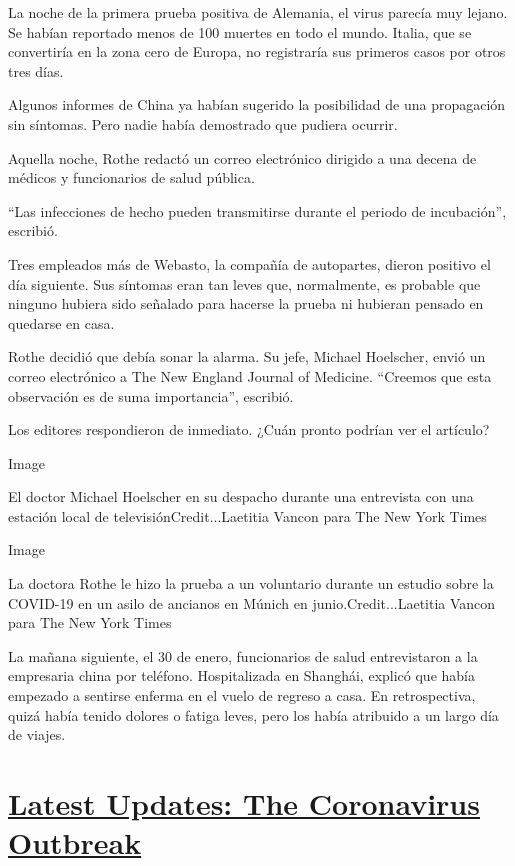 La noche de la primera prueba positiva de Alemania, el virus parecía muy
lejano. Se habían reportado menos de 100 muertes en todo el mundo.
Italia, que se convertiría en la zona cero de Europa, no registraría sus
primeros casos por otros tres días.

Algunos informes de China ya habían sugerido la posibilidad de una
propagación sin síntomas. Pero nadie había demostrado que pudiera
ocurrir.

Aquella noche, Rothe redactó un correo electrónico dirigido a una decena
de médicos y funcionarios de salud pública.

``Las infecciones de hecho pueden transmitirse durante el periodo de
incubación'', escribió.

Tres empleados más de Webasto, la compañía de autopartes, dieron
positivo el día siguiente. Sus síntomas eran tan leves que, normalmente,
es probable que ninguno hubiera sido señalado para hacerse la prueba ni
hubieran pensado en quedarse en casa.

Rothe decidió que debía sonar la alarma. Su jefe, Michael Hoelscher,
envió un correo electrónico a The New England Journal of Medicine.
``Creemos que esta observación es de suma importancia'', escribió.

Los editores respondieron de inmediato. ¿Cuán pronto podrían ver el
artículo?

Image

El doctor Michael Hoelscher en su despacho durante una entrevista con
una estación local de televisiónCredit...Laetitia Vancon para The New
York Times

Image

La doctora Rothe le hizo la prueba a un voluntario durante un estudio
sobre la COVID-19 en un asilo de ancianos en Múnich en
junio.Credit...Laetitia Vancon para The New York Times

La mañana siguiente, el 30 de enero, funcionarios de salud entrevistaron
a la empresaria china por teléfono. Hospitalizada en Shanghái, explicó
que había empezado a sentirse enferma en el vuelo de regreso a casa. En
retrospectiva, quizá había tenido dolores o fatiga leves, pero los había
atribuido a un largo día de viajes.

\hypertarget{latest-updates-the-coronavirus-outbreak}{%
\section{\texorpdfstring{\href{https://www.nytimes3xbfgragh.onion/2020/09/08/world/covid-19-coronavirus.html?action=click\&pgtype=Article\&state=default\&region=MAIN_CONTENT_1\&context=storylines_live_updates}{Latest
Updates: The Coronavirus
Outbreak}}{Latest Updates: The Coronavirus Outbreak}}\label{latest-updates-the-coronavirus-outbreak}}

